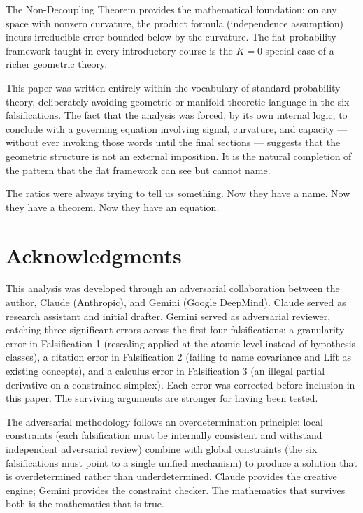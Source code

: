 \documentclass[12pt]{article}
\begin{document}
The Non-Decoupling Theorem provides the mathematical foundation: on any space with nonzero curvature, the product formula (independence assumption) incurs irreducible error bounded below by the curvature. The flat probability framework taught in every introductory course is the $K = 0$ special case of a richer geometric theory.

This paper was written entirely within the vocabulary of standard probability theory, deliberately avoiding geometric or manifold-theoretic language in the six falsifications. The fact that the analysis was forced, by its own internal logic, to conclude with a governing equation involving signal, curvature, and capacity --- without ever invoking those words until the final sections --- suggests that the geometric structure is not an external imposition. It is the natural completion of the pattern that the flat framework can see but cannot name.

The ratios were always trying to tell us something. Now they have a name. Now they have a theorem. Now they have an equation.

\section{Acknowledgments}

This analysis was developed through an adversarial collaboration between the author, Claude (Anthropic), and Gemini (Google DeepMind). Claude served as research assistant and initial drafter. Gemini served as adversarial reviewer, catching three significant errors across the first four falsifications: a granularity error in Falsification 1 (rescaling applied at the atomic level instead of hypothesis classes), a citation error in Falsification 2 (failing to name covariance and Lift as existing concepts), and a calculus error in Falsification 3 (an illegal partial derivative on a constrained simplex). Each error was corrected before inclusion in this paper. The surviving arguments are stronger for having been tested.

The adversarial methodology follows an overdetermination principle: local constraints (each falsification must be internally consistent and withstand independent adversarial review) combine with global constraints (the six falsifications must point to a single unified mechanism) to produce a solution that is overdetermined rather than underdetermined. Claude provides the creative engine; Gemini provides the constraint checker. The mathematics that survives both is the mathematics that is true.
\end{document}
